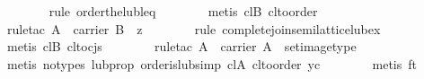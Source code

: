 \begin{isabellebody}
\ \ \ \ \ \ \isamarkupfalse%
\ {}rule\ order{}the{}lub{}leq{}\isanewline
\ \ \ \ \ \ \isamarkupfalse%
\ {}metis\ cl{}B\ cl{}to{}order{}\isanewline
\ \ \ \ \ \ \isamarkupfalse%
\ {}rule{}tac\ {}A\ {}\ {}carrier\ B{}\ \ z{}\isanewline
\ \ \ \ \ \ \isamarkupfalse%
\ {}rule\ complete{}join{}semilattice{}lub{}ex{}\isanewline
\ \ \ \ \ \ \isamarkupfalse%
\ {}metis\ cl{}B\ cl{}to{}cjs{}\isanewline
\ \ \ \ \ \ \isamarkupfalse%
\ {}rule{}tac\ {}A\ {}\ {}carrier\ A{}\ \ set{}image{}type{}\isanewline
\ \ \ \ \ \ \isamarkupfalse%
\ {}metis\ {}no{}types{}\ lub{}prop\ order{}is{}lub{}simp\ cl{}A\ cl{}to{}order\ yc{}\isanewline
\ \ \ \ \ \ \isamarkupfalse%
\ {}metis\ ft{}\isanewline

\end{isabellebody}
